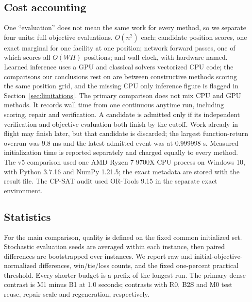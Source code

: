 \documentclass[preprint,12pt,authoryear]{elsarticle}
\begin{document}
\subsection{Cost accounting}
\label{sec:cost}
One ``evaluation'' does not mean the same work for every method, so we separate
four units: full objective evaluations, $O(n^2)$ each; candidate position scores,
one exact marginal for one facility at one position; network forward passes,
one of which scores all $O(WH)$ positions; and wall clock, with hardware
named. Learned inference uses a GPU and classical solvers vectorized CPU code;
the comparisons our conclusions rest on are between constructive methods
scoring the same position grid, and the missing CPU only inference figure is
flagged in Section~\ref{sec:limitations}. The primary comparison
does not mix CPU and GPU methods. It records wall time from one continuous
anytime run, including scoring, repair and verification. A candidate is admitted
only if its independent verification and objective evaluation both finish by
the cutoff. Work already in flight may finish later, but that candidate is
discarded; the largest function-return overrun was 9.8 ms and the latest admitted
event was at 0.999998 s. Measured initialization time is reported separately and
charged equally to every method. The v5
comparison used one AMD Ryzen 7 9700X CPU process on Windows 10, with Python
3.7.16 and NumPy 1.21.5; the exact metadata are stored with the result file.
The CP-SAT audit used OR-Tools 9.15 in the separate exact environment.

\subsection{Statistics}
For the main comparison, quality is defined on the fixed common
initialized set. Stochastic evaluation seeds are averaged within each instance,
then paired differences are bootstrapped over instances. We report raw and
initial-objective-normalized differences, win/tie/loss counts, and the
fixed one-percent practical threshold. Every shorter budget is a prefix
of the longest run. The primary dense contrast is M1 minus B1 at 1.0 seconds;
contrasts with R0, B2S and M0 test reuse, repair scale and regeneration,
respectively.
\end{document}
